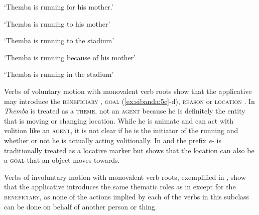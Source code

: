 \documentclass[output=paper]{langsci/langscibook}
\begin{document}
\glt ‘Themba is running for his mother.’ 


\glt ‘Themba is running to his mother’


\glt ‘Themba is running to the stadium’


\glt ‘Themba is running because of his mother’


\glt ‘Themba is running in the stadium’
\z
\z

Verbs of voluntary motion with monovalent verb roots show that the applicative may introduce the \textsc{beneficiary} , \textsc{goal} (\ref{ex:sibanda:5c}-d), \textsc{reason}  or \textsc{location} . In  \textit{Themba} is treated as a \textsc{theme}, not an \textsc{agent} because he is definitely the entity that is moving or changing location. While he is animate and can act with volition like an \textsc{agent,} it is not clear if he is the initiator of the running and whether or not he is actually acting volitionally. In  and  the prefix \textit{e-} is traditionally treated as a locative marker but  shows that the location can also be a \textsc{goal} that an object moves towards.

 Verbs of involuntary motion with monovalent verb roots, exemplified in , show that the applicative introduces the same thematic roles as in  except for the \textsc{beneficiary,} as none of the actions implied by each of the verbs in this subclass can be done on behalf of another person or thing.
\end{document}
